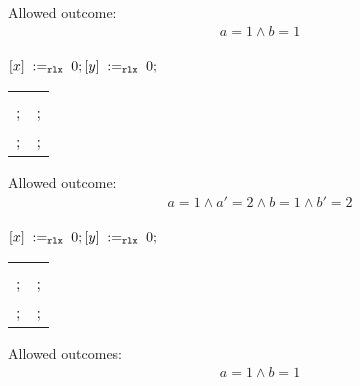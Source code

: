 \begin{minipage}[t]{0.3\linewidth}
Allowed outcome:\\
\[\begin{array}{l}
a = 1 \land b = 1\\
\end{array}\]
\end{minipage}
%
\codePrefix
  $[x] \;:=_{\mathtt{rlx}}\;0; [y] \;:=_{\mathtt{rlx}}\;0;$ \\
\begin{tabular}{L || L}
   &  \\
  ; & ; \\
  ; & ; \\
\end{tabular}
\codePostfix

\litmusTestEnd

\begin{minipage}[t]{0.3\linewidth}
Allowed outcome:\\
\[\begin{array}{l}
a = 1 \land a' = 2 \land b = 1 \land b' = 2 \\
\end{array}\]
\end{minipage}
%
\codePrefix
  $[x] \;:=_{\mathtt{rlx}}\;0; [y] \;:=_{\mathtt{rlx}}\;0;$ \\
\begin{tabular}{L || L}
   &  \\
  ; & ; \\
  ; & ; \\
\end{tabular}
\codePostfix

\litmusTestEnd

\begin{minipage}[t]{0.2\linewidth}
Allowed outcomes:\\
\[\begin{array}{l}
a = 1 \land b = 1 \\
\end{array}\]
\end{minipage}
%
\lbJoinTemplate{\rlx}{\rlx}{\rlx}{\rlx}
\litmusTestEnd

